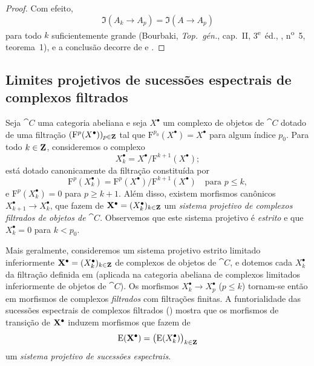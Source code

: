 \begin{proof}
Com efeito,
\[
  \Im(A_k\longrightarrow A_p)
  =
  \Im(A\longrightarrow A_p)
\]
para todo $k$ suficientemente grande
(Bourbaki, \emph{Top.\ g\'{e}n.}, cap.~II,
3\textsuperscript{e}~\'{e}d., ,
n\textsuperscript{o}~5, teorema~1), e a conclusão decorre de
 e .
\end{proof}

\subsection{Limites projetivos de sucessões espectrais de complexos filtrados}
\label{subsection:0.13.5}

\begin{env}[13.5.1]
\label{0.13.5.1}
Seja $\cat{C}$ uma categoria abeliana e seja $X^\bullet$ um complexo
de objetos de $\cat{C}$ dotado de uma filtração
$(\mathrm{F}^p(X^\bullet))_{p\in\mathbf{Z}}$ tal que
$\mathrm{F}^{p_0}(X^\bullet)=X^\bullet$ para algum índice $p_0$.
Para todo $k\in\mathbf{Z}$, consideremos o complexo
\[
  X^\bullet_k=X^\bullet/\mathrm{F}^{k+1}(X^\bullet);
\]
está dotado canonicamente da filtração constituída por
\[
  \mathrm{F}^p(X^\bullet_k)
  =
  \mathrm{F}^p(X^\bullet)/\mathrm{F}^{k+1}(X^\bullet)
  \quad\text{para }p\leq k,
\]
e $\mathrm{F}^p(X^\bullet_k)=0$ para $p\geq k+1$.
Além disso, existem morfismos canônicos
$X^\bullet_{k+1}\longrightarrow X^\bullet_k$, que fazem de
$\mathbf{X}^\bullet=(X^\bullet_k)_{k\in\mathbf{Z}}$ um \emph{sistema projetivo
de complexos filtrados de objetos de $\cat{C}$}.
Observemos que este sistema projetivo é \emph{estrito} e que
$X^\bullet_k=0$ para $k<p_0$.
\end{env}

\begin{env}[13.5.2]
\label{0.13.5.2}
Mais geralmente, consideremos um sistema projetivo estrito limitado
inferiormente
$\mathbf{X}^\bullet=(X^\bullet_k)_{k\in\mathbf{Z}}$ de complexos de objetos de
$\cat{C}$, e dotemos cada $X^\bullet_k$ da filtração definida em
 (aplicada na categoria abeliana de complexos limitados
inferiormente de objetos de $\cat{C}$).
Os morfismos
$X^\bullet_k\longrightarrow X^\bullet_p$ ($p\leq k$) tornam-se então
em morfismos de complexos \emph{filtrados} com filtrações finitas.
A funtorialidade das sucessões espectrais de complexos filtrados
() mostra que os morfismos de transição de
$\mathbf{X}^\bullet$ induzem morfismos que fazem de
\[
  \mathrm{E}(\mathbf{X}^\bullet)
  =
  \bigl(\mathrm{E}(X^\bullet_k)\bigr)_{k\in\mathbf{Z}}
\]
um \emph{sistema projetivo de sucessões espectrais}.
\end{env}

